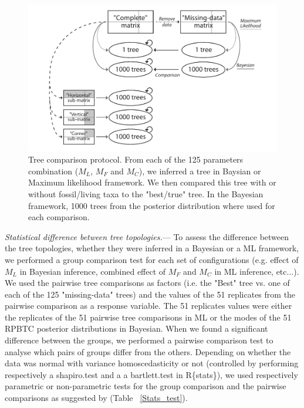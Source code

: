 \documentclass[12pt,letterpaper]{article}
\renewcommand{\subsubsection}[1]{%
\vspace{2ex}
\noindent
\textit{#1.}---}
\begin{document}
\begin{figure} %
\centering
\includegraphics[keepaspectratio=true]{Figures/TEM_Fig_TreeCmp-BW.pdf}
\caption{Tree comparison protocol.
From each of the 125 parameters combination ($M_L$, $M_F$ and $M_C$), we inferred a tree in Baysian or Maximum likelihood framework.
We then compared this tree with or without fossil/living taxa to the "best/true" tree.
In the Bayesian framework, 1000 trees from the posterior distribution where used for each comparison.}
\label{Fig_Compare}
\end{figure}

\subsubsection{Statistical difference between tree topologies}
To assess the difference between the tree topologies, whether they were inferred in a Bayesian or a ML framework, we performed a group comparison test for each set of configurations (e.g. effect of $M_L$ in Bayesian inference, combined effect of $M_F$ and $M_C$ in ML inference, etc...).
We used the pairwise tree comparisons as factors (i.e. the "Best" tree vs. one of each of the 125 "missing-data" trees) and the values of the 51 replicates from the pairwise comparison as a response variable.
The 51 replicates values were either the replicates of the 51 pairwise tree comparisons in ML or the modes of the 51 RPBTC posterior distributions in Bayesian.
When we found a significant difference between the groups, we performed a pairwise comparison test to analyse which pairs of groups differ from the others.
Depending on whether the data was normal with variance homoscedasticity or not (controlled by performing respectively a shapiro.test and a a bartlett.test in R\{stats\}), we used respectively parametric or non-parametric tests for the group comparison and the pairwise comparisons as suggested by \citet{ruxtontime2008} (Table ~\ref{Stats_test}). %
\end{document}

